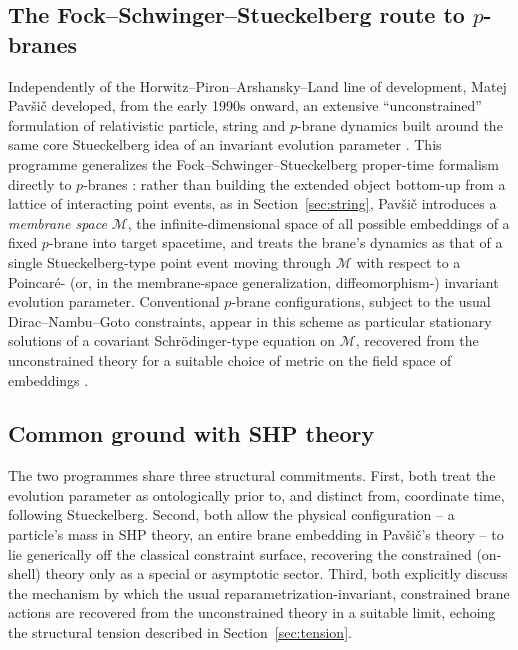 \documentclass[11pt]{article}
\begin{document}
\subsection{The Fock--Schwinger--Stueckelberg route to $p$-branes}

Independently of the Horwitz--Piron--Arshansky--Land line of development,
Matej Pavši\v{c} developed, from the early 1990s onward, an extensive
``unconstrained'' formulation of relativistic particle, string and $p$-brane
dynamics built around the same core Stueckelberg idea of an invariant
evolution parameter
\cite{Pavsic1991a,Pavsic1991b,Pavsic1993}. This programme generalizes the
Fock--Schwinger--Stueckelberg proper-time formalism directly to $p$-branes
\cite{PavsicPbranes1996}: rather than building the extended object bottom-up
from a lattice of interacting point events, as in Section~\ref{sec:string},
Pavši\v{c} introduces a \emph{membrane space} $\mathcal M$, the infinite-dimensional
space of all possible embeddings of a fixed $p$-brane into target spacetime,
and treats the brane's dynamics as that of a single Stueckelberg-type point
event moving through $\mathcal M$ with respect to a Poincar\'e- (or, in the
membrane-space generalization, diffeomorphism-) invariant evolution parameter.
Conventional $p$-brane configurations, subject to the usual Dirac--Nambu--Goto
constraints, appear in this scheme as particular stationary solutions of a
covariant Schr\"odinger-type equation on $\mathcal M$, recovered from the
unconstrained theory for a suitable choice of metric on the field space of
embeddings \cite{Pavsic1991a}.

\subsection{Common ground with SHP theory}

The two programmes share three structural commitments. First, both treat the
evolution parameter as ontologically prior to, and distinct from, coordinate
time, following Stueckelberg. Second, both allow the physical configuration --
a particle's mass in SHP theory, an entire brane embedding in Pavši\v{c}'s
theory -- to lie generically off the classical constraint surface, recovering
the constrained (on-shell) theory only as a special or asymptotic sector.
Third, both explicitly discuss the mechanism by which the usual
reparametrization-invariant, constrained brane actions are recovered from the
unconstrained theory in a suitable limit, echoing the structural tension
described in Section~\ref{sec:tension}.
\end{document}
